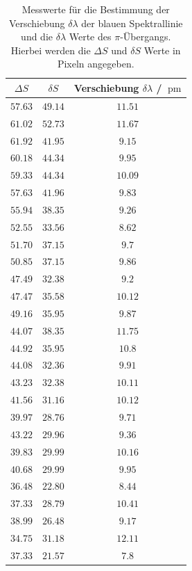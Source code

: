 \begin{table}
    \centering
    \caption{Messwerte für die Bestimmung der Verschiebung $\delta \lambda$ der blauen Spektrallinie und die $\delta\lambda$ Werte des $\pi$-Übergangs. Hierbei werden die $\Delta S$ und $\delta S$ Werte in Pixeln angegeben.}
    \label{tab:blau_pi}
    \begin{tabular}{c c c}
        \toprule
        $\Delta S$&$\delta S$&Verschiebung $\delta \lambda$ / $\SI{}{\pico\meter}$\\
        \midrule 
        $\num{57.63}$&$\num{49.14}$&$\num{11.51}$\\
        $\num{61.02}$&$\num{52.73}$&$\num{11.67}$\\
        $\num{61.92}$&$\num{41.95}$&$\num{9.15}$\\
        $\num{60.18}$&$\num{44.34}$&$\num{9.95}$\\
        $\num{59.33}$&$\num{44.34}$&$\num{10.09}$\\
        $\num{57.63}$&$\num{41.96}$&$\num{9.83}$\\
        $\num{55.94}$&$\num{38.35}$&$\num{9.26}$\\
        $\num{52.55}$&$\num{33.56}$&$\num{8.62}$\\
        $\num{51.70}$&$\num{37.15}$&$\num{9.7}$\\
        $\num{50.85}$&$\num{37.15}$&$\num{9.86}$\\
        $\num{47.49}$&$\num{32.38}$&$\num{9.2}$\\
        $\num{47.47}$&$\num{35.58}$&$\num{10.12}$\\
        $\num{49.16}$&$\num{35.95}$&$\num{9.87}$\\
        $\num{44.07}$&$\num{38.35}$&$\num{11.75}$\\
        $\num{44.92}$&$\num{35.95}$&$\num{10.8}$\\
        $\num{44.08}$&$\num{32.36}$&$\num{9.91}$\\
        $\num{43.23}$&$\num{32.38}$&$\num{10.11}$\\
        $\num{41.56}$&$\num{31.16}$&$\num{10.12}$\\
        $\num{39.97}$&$\num{28.76}$&$\num{9.71}$\\
        $\num{43.22}$&$\num{29.96}$&$\num{9.36}$\\
        $\num{39.83}$&$\num{29.99}$&$\num{10.16}$\\
        $\num{40.68}$&$\num{29.99}$&$\num{9.95}$\\
        $\num{36.48}$&$\num{22.80}$&$\num{8.44}$\\
        $\num{37.33}$&$\num{28.79}$&$\num{10.41}$\\
        $\num{38.99}$&$\num{26.48}$&$\num{9.17}$\\
        $\num{34.75}$&$\num{31.18}$&$\num{12.11}$\\
        $\num{37.33}$&$\num{21.57}$&$\num{7.8}$\\
        \bottomrule
    \end{tabular} 
\end{table}
